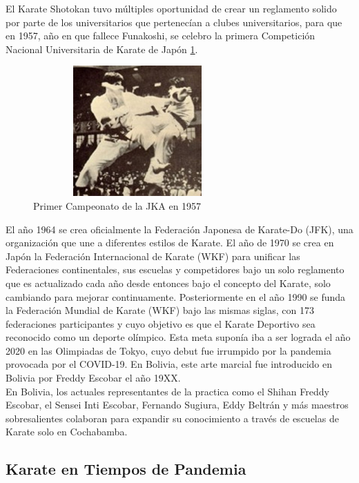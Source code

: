 El Karate Shotokan tuvo múltiples oportunidad de crear un reglamento solido por parte de los universitarios que pertenecían a clubes universitarios, para que en 1957, año en que fallece Funakoshi, se celebro la primera Competición Nacional Universitaria de Karate de Japón \ref{jkachamp}.

\begin{figure}[t!]
	\centering
	\includegraphics[width=8cm,height=5cm,]{./Images/1stJKAChampionships1957.png}
	\caption{Primer Campeonato de la JKA en 1957}
	\label{jkachamp}
\end{figure}

El año 1964 se crea oficialmente la Federación Japonesa de Karate-Do (JFK), una organización que une a diferentes estilos de Karate. El año de 1970 se crea en Japón la Federación Internacional de Karate (WKF) para unificar las Federaciones continentales, sus escuelas y competidores bajo un solo reglamento que es actualizado cada año desde entonces bajo el concepto del Karate, solo cambiando para mejorar continuamente. Posteriormente en el año 1990 se funda la Federación Mundial de Karate (WKF) bajo las mismas siglas, con 173 federaciones participantes y cuyo objetivo es que el Karate Deportivo sea reconocido como un deporte olímpico. Esta meta suponía iba a ser lograda el año 2020 en las Olimpiadas de Tokyo, cuyo debut fue irrumpido por la pandemia provocada por el COVID-19. En Bolivia, este arte marcial fue introducido en Bolivia por Freddy Escobar  el año 19XX\cite{Inti}. \\

En Bolivia, los actuales representantes de la practica como el Shihan Freddy Escobar, el Sensei Inti Escobar, Fernando Sugiura, Eddy Beltrán y más maestros sobresalientes colaboran para expandir su conocimiento a través de escuelas de Karate solo en Cochabamba.\\[1cm]


\subsection{Karate en Tiempos de Pandemia}

